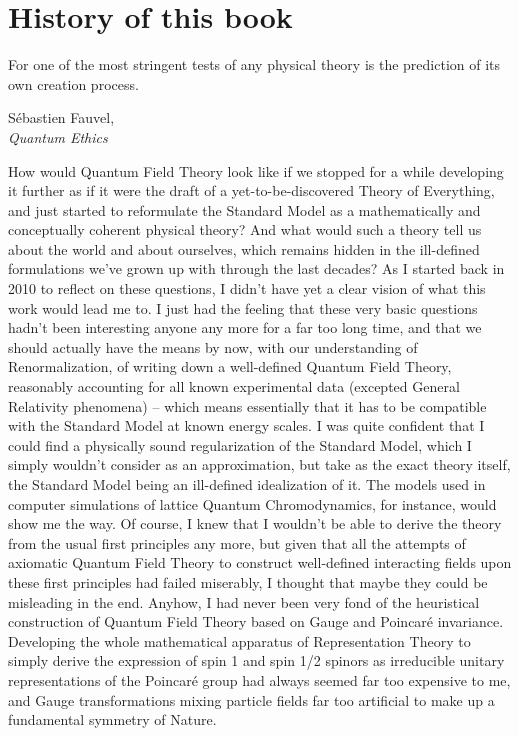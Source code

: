 \chapter*{History of this book}

\renewcommand{\epigraphwidth}{8.3cm}
\epigraph{For one of the most stringent tests of any physical theory is the prediction of its own creation process.}{Sébastien Fauvel,\\\textit{Quantum Ethics}~\cite{Fauvel2013}}

How would Quantum Field Theory look like if we stopped for a while developing it further as if it were the draft of a yet-to-be-discovered Theory of Everything, and just started to reformulate the Standard Model as a mathematically and conceptually coherent physical theory? And what would such a theory tell us about the world and about ourselves, which remains hidden in the ill-defined formulations we've grown up with through the last decades? As I started back in 2010 to reflect on these questions, I didn't have yet a clear vision of what this work would lead me to. I just had the feeling that these very basic questions hadn't been interesting anyone any more for a far too long time, and that we should actually have the means by now, with our understanding of Renormalization, of writing down a well-defined Quantum Field Theory, reasonably accounting for all known experimental data (excepted General Relativity phenomena) -- which means essentially that it has to be compatible with the Standard Model at known energy scales. I was quite confident that I could find a physically sound regularization of the Standard Model, which I simply wouldn't consider as an approximation, but take as the exact theory itself, the Standard Model being an ill-defined idealization of it. The models used in computer simulations of lattice Quantum Chromodynamics, for instance, would show me the way. Of course, I knew that I wouldn't be able to derive the theory from the usual first principles any more, but given that all the attempts of axiomatic Quantum Field Theory to construct well-defined interacting fields upon these first principles had failed miserably, I thought that maybe they could be misleading in the end. Anyhow, I had never been very fond of the heuristical construction of Quantum Field Theory based on Gauge and Poincaré invariance. Developing the whole mathematical apparatus of Representation Theory to simply derive the expression of spin 1 and spin 1/2 spinors as irreducible unitary representations of the Poincaré group had always seemed far too expensive to me, and Gauge transformations mixing particle fields far too artificial to make up a fundamental symmetry of Nature.

